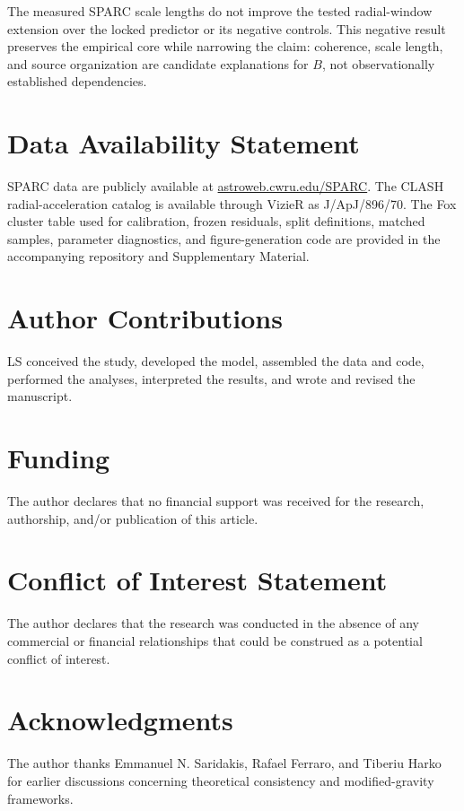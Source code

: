 \documentclass[utf8]{FrontiersinHarvard}
\begin{document}
The measured SPARC scale lengths do not improve the tested radial-window extension over the locked predictor or its negative controls. This negative result preserves the empirical core while narrowing the claim: coherence, scale length, and source organization are candidate explanations for \(B\), not observationally established dependencies.

\section*{Data Availability Statement}

SPARC data are publicly available at \href{http://astroweb.cwru.edu/SPARC/}{astroweb.cwru.edu/SPARC}. The CLASH radial-acceleration catalog is available through VizieR as J/ApJ/896/70. The Fox cluster table used for calibration, frozen residuals, split definitions, matched samples, parameter diagnostics, and figure-generation code are provided in the accompanying repository and Supplementary Material.

\section*{Author Contributions}

LS conceived the study, developed the model, assembled the data and code, performed the analyses, interpreted the results, and wrote and revised the manuscript.

\section*{Funding}

The author declares that no financial support was received for the research, authorship, and/or publication of this article.

\section*{Conflict of Interest Statement}

The author declares that the research was conducted in the absence of any commercial or financial relationships that could be construed as a potential conflict of interest.

\section*{Acknowledgments}

The author thanks Emmanuel N. Saridakis, Rafael Ferraro, and Tiberiu Harko for earlier discussions concerning theoretical consistency and modified-gravity frameworks.
\end{document}
